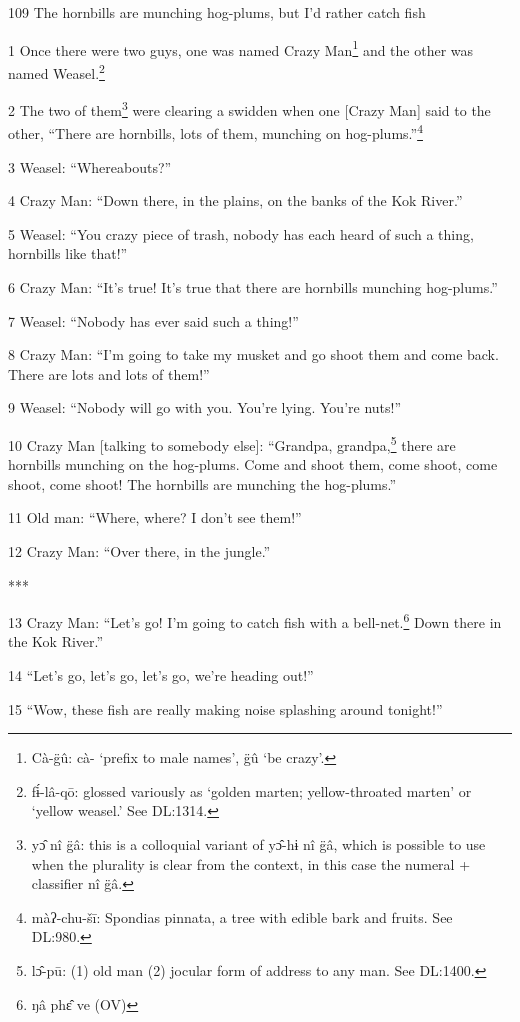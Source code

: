
109 The hornbills are munching hog-plums, but I'd rather catch fish

1 Once there were two guys, one was named Crazy Man\footnote{Cà-g̈û: cà- `prefix to male names', g̈û `be crazy'.} and the other was named
Weasel.\footnote{fɨ́-lâ-qō: glossed variously as `golden marten; yellow-throated marten' or `yellow weasel.' See DL:1314.}

2 The two of them\footnote{yɔ̂ nî g̈â: this is a colloquial variant of yɔ̂-hɨ nî g̈â, which is possible to use when the plurality is clear from the context, in this case the numeral + classifier nî g̈â.} were clearing a swidden when one [Crazy Man] said to the
other, ``There are hornbills, lots of them, munching on hog-plums.''\footnote{màʔ-chu-šī: Spondias pinnata, a tree with edible bark and fruits. See DL:980.}

3 Weasel: ``Whereabouts?''

4 Crazy Man: ``Down there, in the plains, on the banks of the Kok River.''

5 Weasel: ``You crazy piece of trash, nobody has each heard of such a thing, hornbills
like that!''

6 Crazy Man: ``It's true! It's true that there are hornbills munching hog-plums.''

7 Weasel: ``Nobody has ever said such a thing!''

8 Crazy Man: ``I'm going to take my musket and go shoot them and come back. There
are lots and lots of them!''

9 Weasel: ``Nobody will go with you. You're lying. You're nuts!''

10 Crazy Man [talking to somebody else]: ``Grandpa, grandpa,\footnote{lɔ̂-pū: (1) old man (2) jocular form of address to any man. See DL:1400.} there are hornbills
munching on the hog-plums. Come and shoot them, come shoot, come shoot, come shoot!
The hornbills are munching the hog-plums.''

11 Old man: ``Where, where? I don't see them!''

12 Crazy Man: ``Over there, in the jungle.''

***

13 Crazy Man: ``Let's go! I'm going to catch fish with a bell-net.\footnote{ŋâ phɛ̂ ve (OV)} Down there
in the Kok River.''

14 ``Let's go, let's go, let's go, we're heading out!''

15 ``Wow, these fish are really making noise splashing around tonight!''

